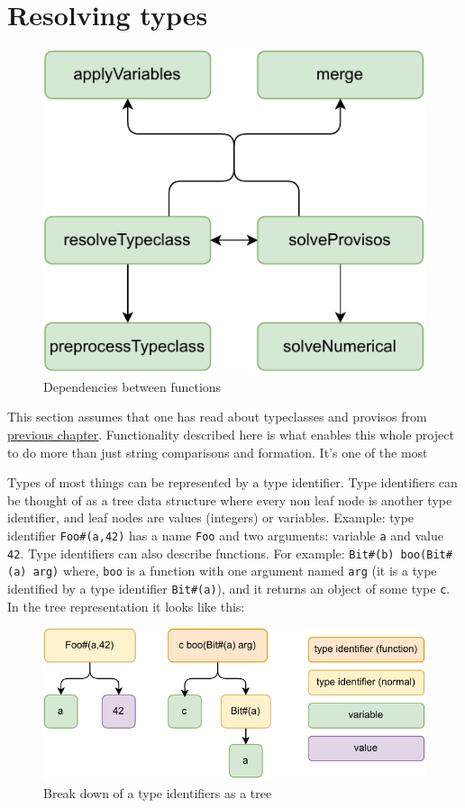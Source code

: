 \documentclass[12pt]{report}
\begin{document}
\section{Resolving types}
\begin{figure}[!h]
    \centering
    \caption{Dependencies between functions}

    \includegraphics[width=0.5\columnwidth]{pdfExports/LargeMapResolve.pdf}
\end{figure}
This section assumes that one has read about typeclasses and provisos from \hyperref[sec:Typeclasses]{previous chapter}.
Functionality described here is what enables this whole project to do more than just string comparisons and formation. It's one of the most 
\par
Types of most things can be represented by a type identifier.
Type identifiers can be thought of as a tree data structure where every non leaf node is another type identifier, and leaf nodes are values (integers) or variables. 
Example: type identifier \verb!Foo#(a,42)! has a name \verb!Foo! and two arguments: variable \verb!a! and value \verb!42!.
Type identifiers can also describe functions.
For example: \verb!Bit#(b) boo(Bit#(a) arg)! where, 
\verb!boo! is a function with one argument named \verb!arg! (it is a type identified by a type identifier \verb!Bit#(a)!), and it returns an object of some type \verb!c!. In the tree representation it looks like this:
\begin{figure}[H]
    \centering
    \caption{Break down of a type identifiers as a tree}
    \includegraphics[width=0.7\columnwidth]{pdfExports/LargeMap-FunctionBreakDown.drawio.pdf}
\end{figure}
\end{document}
